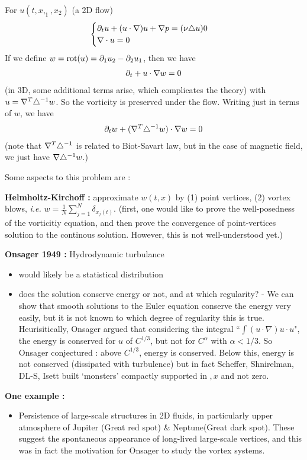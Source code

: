 \documentclass[12pt,a4paper]{extarticle}
\begin{document}
For $u(t,x,_1, x_2)$ (a 2D flow)
\begin{align*}
\begin{cases}
\partial_t u + (u\cdot \nabla) u + \nabla p = (\nu \triangle u)0 \\
\nabla \cdot u=0
\end{cases}
\end{align*}
If we define $w = \text{rot}(u) = \partial_1 u_2 -\partial_2 u_1$, then we have
\begin{align*}
\partial_t + u\cdot \nabla w =0
\end{align*}
(in 3D, some additional terms arise, which complicates the theory) with $u = \nabla^T \triangle^{-1}w$. So the vorticity is preserved under the flow. Writing just in terms of $w$, we have
\begin{align*}
\partial_t w + (\nabla^T \triangle^{-1} w)\cdot \nabla w =0
\end{align*}
(note that $\nabla^T \triangle^{-1}$ is related to Biot-Savart law, but in the case of magnetic field, we just have $\nabla \triangle^{-1}w$.)
\s

Some aspects to this problem are :
\s

\textbf{Helmholtz-Kirchoff :} approximate $w(t,x)$ by (1) point vertices, (2) vortex blows, \textit{i.e.} $w= \frac{1}{N}\sum_{j=1}^N \delta_{x_j(t)}$. (first, one would like to prove the well-posedness of the vorticitiy equation, and then prove the convergence of point-vertices solution to the continous solution. However, this is not well-understood yet.)
\s

\textbf{Onsager 1949 :} Hydrodynamic turbulance
\begin{itemize}
\item would likely be a statistical distribution
\item does the solution conserve energy or not, and at which regularity? - We can show that smooth solutions to the Euler equation conserve the energy very easily, but it is not known to which degree of regularity this is true. Heurisitically, Onsager argued that considering the integral ``$\int (u\cdot \nabla)u \cdot u$", the energy is conserved for $u$ of $C^{1/3}$, but not for $C^{\alpha}$ with $\alpha < 1/3$. So Onsager conjectured : above $C^{1/3}$, energy is conserved. Below this, energy is not conserved (dissipated with turbulence) but in fact Scheffer, Shnirelman, DL-S, Isett built `monsters' compactly supported in $,x$ and not zero. 
\end{itemize}
\s

\textbf{One example :}
\begin{itemize}
\item Persistence of large-scale structures in 2D fluids, in particularly upper atmosphere of Jupiter (Great red spot) \& Neptune(Great dark spot). These suggest the spontaneous appearance of long-lived large-scale vertices, and this was in fact the motivation for Onsager to study the vortex systems.
\end{itemize}
\s
\end{document}

